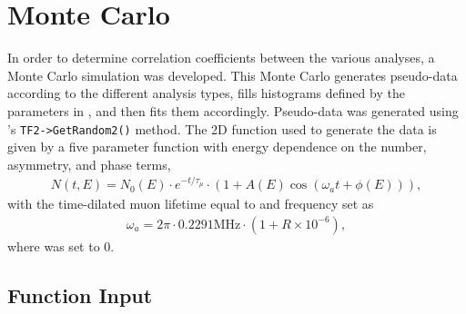 
\graphicspath{{Body/Figures/EvW/}}

\section{Monte Carlo}


In order to determine correlation coefficients between the various analyses, a Monte Carlo simulation was developed. This Monte Carlo generates pseudo-data according to the different analysis types, fills histograms defined by the parameters in , and then fits them accordingly. Pseudo-data was generated using \ROOT's \texttt{TF2->GetRandom2()} method. The 2D function used to generate the data is given by a five parameter function with energy dependence on the number, asymmetry, and phase terms,
\begin{align}
	N(t, E) = N_{0}(E) \cdot e^{-t/\tau_{\mu}} \cdot (1 + A(E) \cos{(\omega_{a}t + \phi(E))}),
\label{eq:2dfunc}
\end{align}
with the time-dilated muon lifetime \taumu equal to  and \gmtwo frequency \wa set as
\begin{align}
	\omega_{a} = 2\pi \cdot 0.2291 \text{MHz} \cdot (1 + R \times 10^{-6}),
\end{align}
where \R was set to 0. 


\subsection{Function Input}


